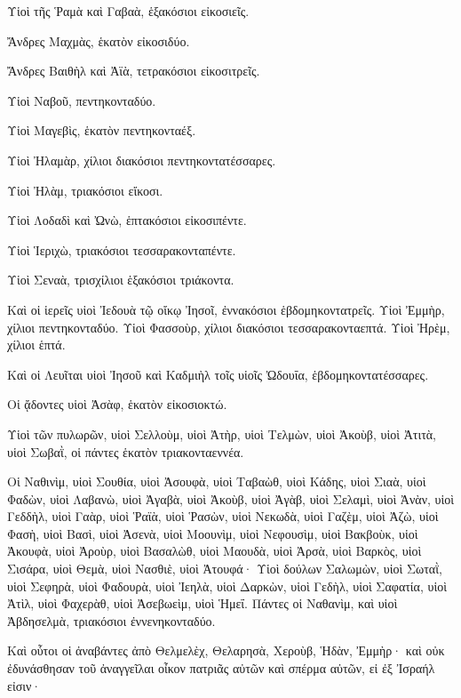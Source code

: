 {\par }{\PP {}Υἱοὶ τῆς Ῥαμὰ καὶ Γαβαὰ, ἑξακόσιοι εἰκοσιεῖς.
\par }{\PP {}Ἄνδρες Μαχμὰς, ἑκατὸν εἰκοσιδύο.
\par }{\PP {}Ἄνδρες Βαιθὴλ καὶ Ἀϊὰ, τετρακόσιοι εἰκοσιτρεῖς.
\par }{\PP {}Υἱοὶ Ναβοῦ, πεντηκονταδύο.
\par }{\PP {}Υἱοὶ Μαγεβὶς, ἑκατὸν πεντηκονταέξ.
\par }{\PP {}Υἱοὶ Ἠλαμὰρ, χίλιοι διακόσιοι πεντηκοντατέσσαρες.
\par }{\PP {}Υἱοὶ Ἠλὰμ, τριακόσιοι εἴκοσι.
\par }{\PP {}Υἱοὶ Λοδαδὶ καὶ Ὠνὼ, ἑπτακόσιοι εἰκοσιπέντε.
\par }{\PP {}Υἱοὶ Ἱεριχὼ, τριακόσιοι τεσσαρακονταπέντε.
\par }{\PP {}Υἱοὶ Σεναὰ, τρισχίλιοι ἑξακόσιοι τριάκοντα.
\par }{\PP {}Καὶ οἱ ἱερεῖς υἱοὶ Ἰεδουὰ τῷ οἴκῳ Ἰησοῖ, ἐννακόσιοι ἑβδομηκοντατρεῖς.
Υἱοὶ Ἐμμὴρ, χίλιοι πεντηκονταδύο.
Υἱοὶ Φασσοὺρ, χίλιοι διακόσιοι τεσσαρακονταεπτά.
Υἱοὶ Ἠρὲμ, χίλιοι ἑπτά.
\par }{\PP {}Καὶ οἱ Λευῖται υἱοὶ Ἰησοῦ καὶ Καδμιὴλ τοῖς υἱοῖς Ὠδουΐα, ἑβδομηκοντατέσσαρες.
\par }{\PP {}Οἱ ᾄδοντες υἱοὶ Ἀσὰφ, ἑκατὸν εἰκοσιοκτώ.
\par }{\PP {}Υἱοὶ τῶν πυλωρῶν, υἱοὶ Σελλοὺμ, υἱοὶ Ἀτὴρ, υἱοὶ Τελμὼν, υἱοὶ Ἀκοὺβ, υἱοὶ Ἀτιτὰ, υἱοὶ Σωβαῒ, οἱ πάντες ἑκατὸν τριακονταεννέα.
\par }{\PP {}Οἱ Ναθινὶμ, υἱοὶ Σουθία, υἱοὶ Ἀσουφὰ, υἱοὶ Ταβαὼθ,
υἱοὶ Κάδης, υἱοὶ Σιαὰ, υἱοὶ Φαδὼν,
υἱοὶ Λαβανὼ, υἱοὶ Ἀγαβὰ, υἱοὶ Ἀκοὺβ,
υἱοὶ Ἀγὰβ, υἱοὶ Σελαμὶ, υἱοὶ Ἀνὰν,
υἱοὶ Γεδδὴλ, υἱοὶ Γαὰρ, υἱοὶ Ῥαϊὰ,
υἱοὶ Ῥασὼν, υἱοὶ Νεκωδὰ, υἱοὶ Γαζὲμ,
υἱοὶ Ἀζὼ, υἱοὶ Φασὴ, υἱοὶ Βασὶ,
υἱοὶ Ἀσενὰ, υἱοὶ Μοουνὶμ, υἱοὶ Νεφουσὶμ,
υἱοὶ Βακβοὺκ, υἱοὶ Ἀκουφὰ, υἱοὶ Ἀροὺρ,
υἱοὶ Βασαλὼθ, υἱοὶ Μαουδὰ, υἱοὶ Ἀρσὰ,
υἱοὶ Βαρκὸς, υἱοὶ Σισάρα, υἱοὶ Θεμὰ,
υἱοὶ Νασθιὲ, υἱοὶ Ἀτουφά·
Υἱοὶ δούλων Σαλωμὼν, υἱοὶ Σωταῒ, υἱοὶ Σεφηρὰ, υἱοὶ Φαδουρὰ,
υἱοὶ Ἰεηλὰ, υἱοὶ Δαρκὼν, υἱοὶ Γεδὴλ,
υἱοὶ Σαφατία, υἱοὶ Ἀτὶλ, υἱοὶ Φαχερὰθ, υἱοὶ Ἀσεβωεὶμ, υἱοὶ Ἡμεΐ.
Πάντες οἱ Ναθανὶμ, καὶ υἱοὶ Ἀβδησελμὰ, τριακόσιοι ἐννενηκονταδύο.
\par }{\PP {}Καὶ οὗτοι οἱ ἀναβάντες ἀπὸ Θελμελὲχ, Θελαρησὰ, Χεροὺβ, Ἡδὰν, Ἐμμὴρ· καὶ οὐκ ἐδυνάσθησαν τοῦ ἀναγγεῖλαι οἶκον πατριᾶς αὐτῶν καὶ σπέρμα αὐτῶν, εἰ ἐξ Ἰσραήλ εἰσιν·
}
